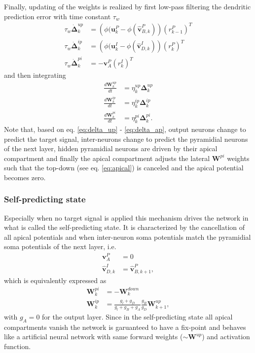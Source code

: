\documentclass[12pt,a4paper]{article}
\begin{document}
Finally, updating of the weights is realized by first low-pass filtering the dendritic prediction error with time constant $\tau_w$
\begin{align}
\tau_w\dot{\bm{\Delta}}^{up}_k &= \left(\phi(\bm{u}^P_k - \phi(\hat{\bm{v}}^P_{B,k})\right)(r^P_{k-1})^T\label{eq:delta_up}\\
\tau_w\dot{\bm{\Delta}}^{ip}_k &= \left(\phi(\bm{u}^I_k - \phi(\hat{\bm{v}}^I_{D,k})\right)(r^P_{k})^T\\
\tau_w\dot{\bm{\Delta}}^{pi}_k &= -\bm{v}^P_A(r^I_{k})^T \label{eq:delta_ap}
\end{align}
and then integrating
\begin{align}
\frac{d\bm{W}^{up}_k}{dt} &= \eta^{up}_k\bm{\Delta}^{up}_k \\
\frac{d\bm{W}^{ip}_k}{dt} &= \eta^{ip}_k\bm{\Delta}^{ip}_k \\
\frac{d\bm{W}^{pi}_k}{dt} &= \eta^{pi}_k\bm{\Delta}^{pi}_k. \label{eq:W_pi}
\end{align}
Note that, based on eq. \eqref{eq:delta_up} - \eqref{eq:delta_ap}, output neurons change to predict the target signal, inter-neurons change to predict the pyramidial neurons of the next layer, hidden pyramidial neurons are driven by their apical compartment and finally the apical compartment adjusts the lateral $\bm{W}^{pi}$ weights such that the top-down (see eq. \eqref{eq:apical}) is canceled and the apical potential becomes zero.\\

\subsubsection{Self-predicting state}
Especially when no target signal is applied this mechanism drives the network in what is called the self-predicting state. It is characterized by the cancellation of all apical potentials and when inter-neuron soma potentials match the pyramidial soma potentials of the next layer, i.e.
\begin{align}
\bm{v}^P_A &= 0\\
\hat{\bm{v}}^I_{D,k} &= \hat{\bm{v}}^P_{B,k+1},
\end{align} 
which is equivalently expressed as 
\begin{align}
\bm{W}^{pi}_k &= - \bm{W}^{down}_k \label{eq:sps_pi} \\
\bm{W}^{ip}_k &= \frac{g_l + g_D}{g_l + g_B + g_A}\frac{g_B}{g_D}\bm{W}^{up}_{k+1}, \label{eq:sps_ip}
\end{align}
with $g_A = 0$ for the output layer. Since in the self-predicting state all apical compartments vanish the network is garuanteed to have a fix-point and behaves like a artificial neural network with same forward weights ($\sim \bm{W}^{up}$) and activation function. 
\end{document}
